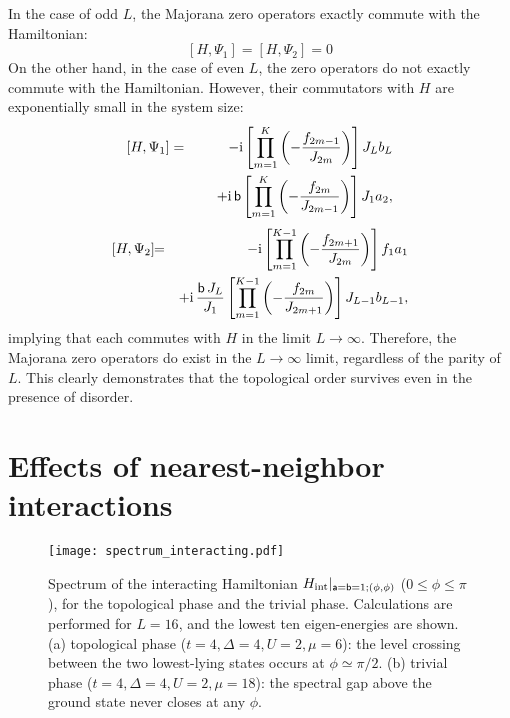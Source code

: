 \documentclass[aps, prb, showpacs, twocolumn, %
amssymb,superscriptaddress]{revtex4}
\newcommand{\ii}{\text{i}}
\begin{document}
In the case of odd $L$, the Majorana zero operators exactly commute with the Hamiltonian:
\begin{equation}
\left[ H, \Psi_{1} \right]
= \left[ H, \Psi_{2} \right]
=0
\end{equation}
On the other hand, in the case of even $L$, the zero operators do not exactly commute with the Hamiltonian. However, their commutators with $H$ are exponentially small in the system size:
\begin{eqnarray}
\left[ H, \Psi_{1} \right] &=& -{\ii} \left[ \prod_{m=1}^{K} \left( - \frac{f_{2m-1}}{J_{2m}} \right) \right] J_{L} b_{L} \nonumber \\
&&~~~~+{\ii}\, {\sf b} \left[ \prod_{m=1}^{K} \left( - \frac{f_{2m}}{J_{2m-1}} \right) \right] J_{1} a_{2},
\end{eqnarray}
\begin{eqnarray}
\left[ H, \Psi_{2} \right]\!\! &=&\!\! -{\ii} \left[ \prod_{m=1}^{K-1} \left( - \frac{f_{2m+1}}{J_{2m}} \right) \right] f_{1} a_{1} \nonumber \\
&&+{\ii}\, \frac{{\sf b}\, J_{L}}{J_{1}} \left[ \prod_{m=1}^{K-1} \left( - \frac{f_{2m}}{J_{2m+1}} \right) \right] J_{L-1} b_{L-1},
\end{eqnarray}
implying that each commutes with $H$ in the limit $L \to \infty$. Therefore, the Majorana zero operators do exist in the $L \to \infty$ limit, regardless of the parity of $L$. This clearly demonstrates that the topological order survives even in the presence of disorder. 



\section{Effects of nearest-neighbor interactions}
\label{sec: interaction}

\begin{figure}[b]
	\texttt{[image: spectrum\_interacting.pdf]} 
	\caption{Spectrum of the interacting Hamiltonian $H_{\rm{int}}|_{{\sf a}={\sf b}=1;(\phi, \phi)}$ ($0\le\phi\le\pi$), for the topological phase and the trivial phase. Calculations are performed for $L=16$, and the lowest ten eigen-energies are shown. (a) topological phase ($t=4, \Delta=4, U=2, \mu=6$): the level crossing between the two lowest-lying states occurs at $\phi \simeq \pi/2$. (b) trivial phase ($t=4, \Delta=4, U=2, \mu=18$): the spectral gap above the ground state never closes at any $\phi$.}
      \label{fig:int}
\end{figure}
\end{document}
